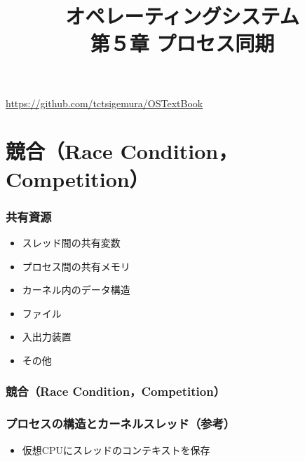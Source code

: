 \documentclass[unicode,handout]{beamer}                   %
\begin{document}
\title[プロセス同期]
      {オペレーティングシステム\\第５章 プロセス同期}
\date{}
\begin{frame}
  \titlepage
  \centerline{\url{https://github.com/tctsigemura/OSTextBook}}
\end{frame}


\section{競合（Race Condition，Competition）}
\begin{frame}
  \frametitle{共有資源}
  \begin{itemize}
    \item スレッド間の共有変数
    \item プロセス間の共有メモリ
    \item カーネル内のデータ構造
    \item ファイル
    \item 入出力装置
    \item その他
  \end{itemize}
\end{frame}

\begin{frame}
  \frametitle{競合（Race Condition，Competition）}
\end{frame}

\begin{frame}
  \frametitle{プロセスの構造とカーネルスレッド（参考）}
  \begin{itemize}
    \item 仮想CPUにスレッドのコンテキストを保存
  \end{itemize}
\end{frame}

\end{document}
